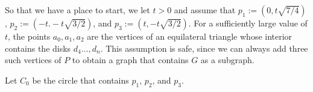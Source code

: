 \documentclass{patmorin}
\begin{document}
So that we have a place to start, we let $t>0$ and assume that $p_1:=(0,t\sqrt{7/4})$, $p_2:=(-t. -t\sqrt{3/2})$, and $p_3:=(t, -t\sqrt{3/2})$.  For a sufficiently large value of $t$, the points $a_0,a_1,a_2$ are the vertices of an equilateral triangle whose interior contains the disks $d_4\ldots,d_n$.  This assumption is safe, since we can always add three such vertices of $P$ to obtain a graph that contains $G$ as a subgraph.

Let $C_0$ be the circle that contains $p_1$, $p_2$, and $p_3$.





\end{document}
